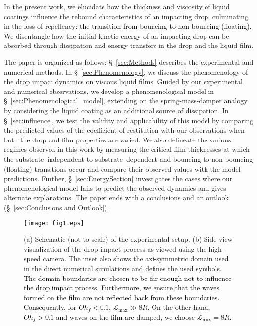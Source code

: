 \documentclass[]{jfm}
\newcommand{\revRev}[1]{\textcolor{black}{#1}}
\begin{document}
	In the present work, we elucidate how the thickness and viscosity of liquid coatings influence the rebound characteristics of an impacting drop, culminating in the loss of repellency\revRev{: the transition from bouncing to non-bouncing (floating).}
	We disentangle how the initial kinetic energy of an impacting drop can be absorbed through dissipation and energy transfers in the drop and the liquid film. 
	
	The paper is organized as follows: \S~\ref{sec:Methods} describes the experimental and numerical methods. In \S~\ref{sec:Phenomenology}, we discuss the phenomenology of the drop impact dynamics on viscous liquid films. 
	Guided by our experimental and numerical observations, we develop a phenomenological model in \S~\ref{sec:Phenomenological_model}, extending on the spring-mass-damper analogy by considering the liquid coating as an additional source of dissipation. In \S~\ref{sec:influence}, we test the validity and applicability of this model by comparing the predicted values of the coefficient of restitution with our observations when both the drop and film properties are varied. 
	We also delineate the various regimes observed in this work by measuring the critical film thicknesses at which the substrate--independent to substrate--dependent and bouncing to non-bouncing (floating) transitions occur and compare their observed values with the model predictions. Further, \S~\ref{sec:EnergySection} investigates the cases where our phenomenological model fails to predict the observed dynamics and gives alternate explanations. The paper ends with a conclusions and an outlook (\S~\ref{sec:Conclusions and Outlook}).
	
	\begin{figure}
		\centering
		\texttt{[image: fig1.eps]}
		\caption{(a) Schematic (not to scale) of the experimental setup. (b) Side view visualization of the drop impact process as viewed using the high-speed camera. The inset also shows the axi-symmetric domain used in the direct numerical simulations and defines the used symbols. \revRev{The domain boundaries are chosen to be far enough not to influence the drop impact process. Furthermore, we ensure that the waves formed on the film are not reflected back from these boundaries. Consequently, for $Oh_f < 0.1$, $\mathcal{L}_{\text{max}} \gg 8R$. On the other hand, $Oh_f > 0.1$ and waves on the film are damped, we choose $\mathcal{L}_{\text{max}} = 8R$.}}
		\label{fig:schematic}
	\end{figure}
	
\end{document}

